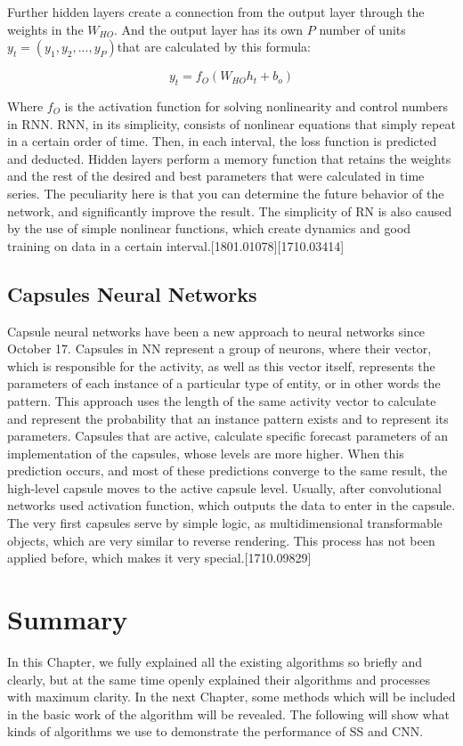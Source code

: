 \par Further hidden layers create a connection from the output layer through the weights in the $W_{HO}$. And the output layer has its own $P$ number of units $y_t = (y_1, y_2, ..., y_P)$that are calculated by this formula:

\begin{equation}
y_t = f_O(W_{HO}h_t + b_o)
\end{equation}

\par Where $f_O$ is the activation function for solving nonlinearity and control numbers in RNN. RNN, in its simplicity, consists of nonlinear equations that simply repeat in a certain order of time. Then, in each interval, the loss function is predicted and deducted. Hidden layers perform a memory function that retains the weights and the rest of the desired and best parameters that were calculated in time series. The peculiarity here is that you can determine the future behavior of the network, and significantly improve the result. The simplicity of RN is also caused by the use of simple nonlinear functions, which create dynamics and good training on data in a certain interval.[1801.01078][1710.03414]

\subsection{Capsules Neural Networks}\label{sec:3.8.3}
\par Capsule neural networks have been a new approach to neural networks since October 17. Capsules in NN represent a group of neurons, where their vector, which is responsible for the activity, as well as this vector itself,  represents the parameters of each instance of a particular type of entity, or in other words the pattern. This approach uses the length of the same activity vector to calculate and represent the probability that an instance pattern exists and to represent its parameters. Capsules that are active, calculate specific forecast parameters of an implementation of the capsules, whose levels are more higher. When this prediction occurs, and most of these predictions converge to the same result, the high-level capsule moves to the active capsule level. Usually, after convolutional networks used activation function, which outputs the data to enter in the capsule. The very first capsules serve by simple logic, as multidimensional transformable objects, which are very similar to reverse rendering. This process has not been applied before, which makes it very special.[1710.09829]




\section{Summary}\label{sec:3.9}
\par In this Chapter, we fully explained all the existing algorithms so briefly and clearly, but at the same time openly explained their algorithms and processes with maximum clarity. In the next Chapter, some methods which will be included in the basic work of the algorithm will be revealed. The following will show what kinds of algorithms we use to demonstrate the performance of SS and CNN.